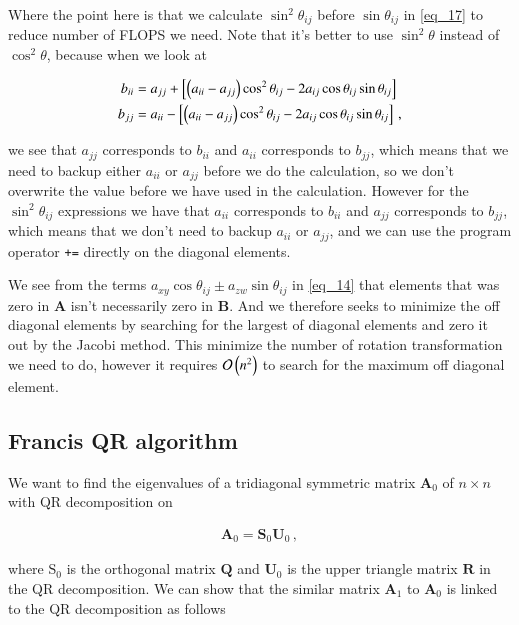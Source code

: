 \documentclass[11pt,english,a4paper]{article}
\begin{document}
\begin{flushleft}
Where the point here is that we calculate $\sin^2\theta_{ij}$ before $\sin\theta_{ij}$ in \eqref{eq_17} to reduce number of FLOPS we need. Note that it's better to use $\sin^2\theta$ instead of $\cos^2\theta$, because when we look at 

\begin{align*}
b_{ii} &= a_{jj} + \left[{\left({a_{ii}-a_{jj}}\right)\cos^2\theta_{ij} - 2a_{ij}\cos\theta_{ij}\sin\theta_{ij}}\right]
\\
b_{jj} &= a_{ii} - \left[{\left({a_{ii}-a_{jj}}\right)\cos^2\theta_{ij} - 2a_{ij}\cos\theta_{ij}\sin\theta_{ij}}\right] \,,
\end{align*}

we see that $a_{jj}$ corresponds to $b_{ii}$ and $a_{ii}$ corresponds to $b_{jj}$, which means that we need to backup either $a_{ii}$ or $a_{jj}$ before we do the calculation, so we don't overwrite the value before we have used in the calculation. However for the $\sin^2\theta_{ij}$ expressions we have that $a_{ii}$ corresponds to $b_{ii}$ and $a_{jj}$ corresponds to $b_{jj}$, which means that we don't need to backup $a_{ii}$ or $a_{jj}$, and we can  use the program operator \texttt{+=} directly on the diagonal elements. \linebreak

We see from the terms $a_{xy}\cos\theta_{ij}\pm a_{zw}\sin\theta_{ij}$ in \eqref{eq_14} that elements that was zero in $\textbf{A}$ isn't necessarily zero in $\textbf{B}$. And we therefore seeks to minimize the off diagonal elements by searching for the largest of diagonal elements and zero it out by the Jacobi method. This minimize the number of rotation transformation we need to do, however it requires $\mathcal{O}\left({n^2}\right)$ to search for the maximum off diagonal element.

\subsection{Francis QR algorithm}\label{sec_QR}

We want to find the eigenvalues of a tridiagonal symmetric matrix $\textbf{A}_0$ of $n\times n$ with QR decomposition on

\begin{align*}
\textbf{A}_0 = \textbf{S}_0\textbf{U}_0 \,,
\end{align*}

where $\text{S}_0$ is the orthogonal matrix $\textbf{Q}$ and $\textbf{U}_0$ is the upper triangle matrix $\textbf{R}$ in the QR decomposition. We can show that the similar matrix $\textbf{A}_1$ to $\textbf{A}_0$ is linked to the QR decomposition as follows


\end{flushleft}
\end{document}

